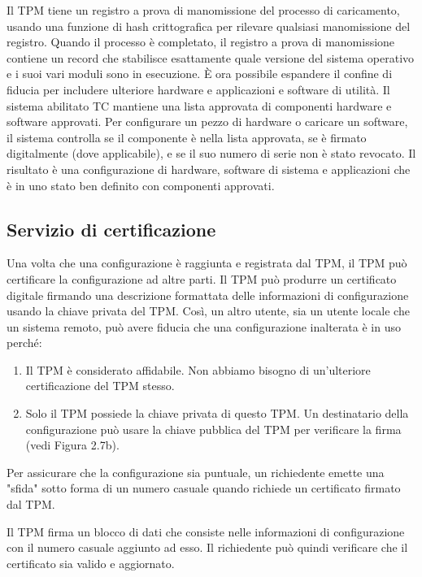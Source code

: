 \singlespacing

Il TPM tiene un registro a prova di manomissione del processo di caricamento, usando una funzione di hash crittografica per rilevare qualsiasi manomissione del registro. Quando il processo è completato, il registro a prova di manomissione contiene un record che stabilisce esattamente quale versione del sistema operativo e i suoi vari moduli sono in esecuzione. È ora possibile espandere il confine di fiducia per includere ulteriore hardware e applicazioni e software di utilità. Il sistema abilitato TC mantiene una lista approvata di componenti hardware e software approvati. Per configurare un pezzo di hardware o caricare un software, il sistema controlla se il componente è nella lista approvata, se è firmato digitalmente (dove applicabile), e se il suo numero di serie non è stato revocato. Il risultato è una configurazione di hardware, software di sistema e applicazioni che è in uno stato ben definito con componenti approvati.
\subsection{Servizio di certificazione}
Una volta che una configurazione è raggiunta e registrata dal TPM, il TPM può certificare la configurazione ad altre parti. Il TPM può produrre un certificato digitale firmando una descrizione formattata delle informazioni di configurazione usando la chiave privata del TPM. Così, un altro utente, sia un utente locale che un sistema remoto, può avere fiducia che una configurazione inalterata è in uso perché:

\begin{enumerate}
    \item Il TPM è considerato affidabile. Non abbiamo bisogno di un'ulteriore certificazione del TPM stesso.
    
    \item Solo il TPM possiede la chiave privata di questo TPM. Un destinatario della configurazione può usare la chiave pubblica del TPM per verificare la firma (vedi Figura 2.7b).
\end{enumerate}
Per assicurare che la configurazione sia puntuale, un richiedente emette una "sfida" sotto forma di un numero casuale quando richiede un certificato firmato dal TPM.

\singlespacing

Il TPM firma un blocco di dati che consiste nelle informazioni di configurazione con il numero casuale aggiunto ad esso. Il richiedente può quindi verificare che il certificato sia valido e aggiornato.

